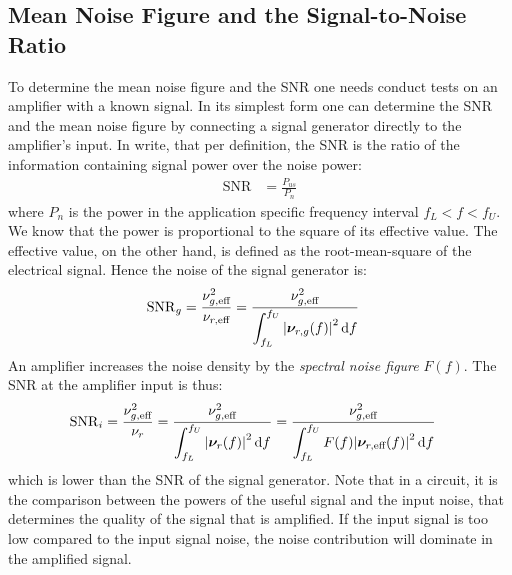 \subsection{Mean Noise Figure and the Signal-to-Noise Ratio}
To determine the mean noise figure and the \acf{SNR} one needs conduct tests on an amplifier with a known signal. In its simplest form one can determine the \ac{SNR} and the mean noise figure by connecting a signal generator directly to the amplifier's input. In \cite{Tietze2008EC} \citeauthor{Tietze2008EC} write, that per definition, the \ac{SNR} is the ratio of the information containing signal power over the noise power:
\begin{align}
  \mathrm{SNR} &= \frac{P_{us}}{P_n}
\end{align}
where $P_n$ is the power in the application specific frequency interval $f_L<f<f_U$. We know that the power is proportional to the square of its effective value. The effective value, on the other hand, is defined as the root-mean-square of the electrical signal. Hence the noise of the signal generator is:
\begin{align}
  \mathrm{SNR}_g &= \frac{\nu_{g,\text{eff}}^2}{\nu_{r,\text{eff}}} = \frac{\nu_{g,\text{eff}}^2}{\displaystyle\int_{f_L}^{f_U} \abs{\bm{\nu}_{r,g}(f)}^2 \dd{f}} \label{eqn:snr_g}
\end{align}
An amplifier increases the noise density by the \emph{spectral noise figure} $F(f)$. The \ac{SNR} at the amplifier input is thus:
\begin{align}
  \mathrm{SNR}_i &= \frac{\nu_{g,\text{eff}}^2}{\nu_r} = \frac{\nu_{g,\text{eff}}^2}{\displaystyle\int_{f_L}^{f_U} \abs{\bm{\nu}_r(f)}^2 \dd{f}} = \frac{\nu_{g,\text{eff}}^2}{\displaystyle\int_{f_L}^{f_U} F(f)\abs{\bm{\nu}_{r,\text{eff}}(f)}^2 \dd{f}} \label{eqn:snr_i}
\end{align}
which is lower than the \ac{SNR} of the signal generator. Note that in a circuit, it is the comparison between the powers of the useful signal and the input noise, that determines the quality of the signal that is amplified. If the input signal is too low compared to the input signal noise, the noise contribution will dominate in the amplified signal.

